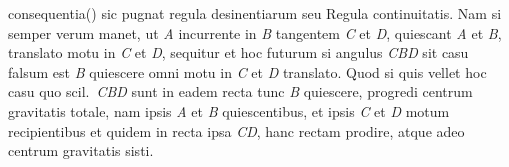 consequentia\protect\vphantom() sic pugnat 
regula desinentiarum seu Regula continuitatis.
Nam si semper verum manet, ut \textit{A} incurrente in \textit{B} tangentem \textit{C} et \textit{D}, quiescant \textit{A} et \textit{B}, translato motu in \textit{C} et \textit{D}, sequitur et hoc futurum si angulus \textit{CBD} sit  %
casu falsum est \textit{B} quiescere omni motu in \textit{C} et \textit{D} translato. 
Quod si quis vellet hoc casu quo scil.\ \textit{CBD} sunt in eadem recta tunc \textit{B} %
quiescere, %
progredi centrum gravitatis totale, nam ipsis \textit{A} et \textit{B} quiescentibus, et ipsis \textit{C} et \textit{D} motum recipientibus et quidem in recta ipsa \textit{CD}, %
hanc rectam prodire, atque adeo centrum gravitatis sisti.%
%
\pend
